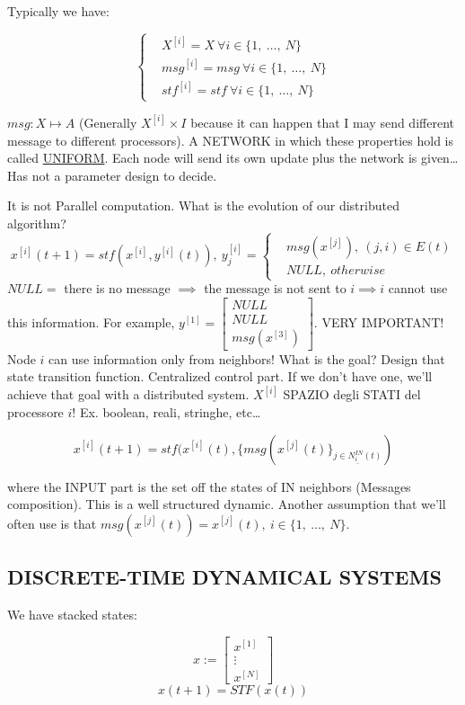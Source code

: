 Typically we have:

\[
	\left\{
	\begin{aligned}
	&X^{[i]} = X\ \forall i \in \{1,\ \dots,\ N\} \\
	&msg^{[i]} = msg\ \forall i \in \{1,\ \dots,\ N\} \\
	&stf^{[i]} = stf\ \forall i \in \{1,\ \dots,\ N\}
	\end{aligned} 
	\right.
\]

$msg:X \mapsto A$ (Generally $X^{[i]}\times I$ because it can happen that I may send different message to different processors).
A NETWORK in which these properties hold is called \underline{UNIFORM}. Each node will send its own update plus the network is given\dots Has not a parameter design to decide.

It is not Parallel computation. What is the evolution of our distributed algorithm?
\[
	x^{[i]}(t+1) = stf(x^{[i]},y^{[i]}(t)),\ y^{[i]}_j = \left\{
	\begin{aligned}
	&msg(x^{[j]}),\ (j,i)\in E(t) \\
	&NULL,\ otherwise
	\end{aligned} 
	\right.
\]
$NULL=$ there is no message $\implies$ the message is not sent to $i \implies i$ cannot use this information.
For example, $y^{[1]} = \begin{bmatrix}NULL\\NULL\\msg(x^{[3]})\end{bmatrix}$. VERY IMPORTANT! Node $i$ can use information only from neighbors!
What is the goal? Design that state transition function. Centralized control part. If we don't have one, we'll achieve that goal with a distributed system. $X^{[i]}$ SPAZIO degli STATI del processore $i$! Ex. boolean, reali, stringhe, etc\dots

\[
	x^{[i]}(t+1) = stf(x^{[i]}(t), \{msg(x^{[j]}(t)\}_{\underline{j\in N_i^{IN}(t)}})
\]

where the INPUT part is the set off the states of IN neighbors (Messages composition). This is a well structured dynamic. Another assumption that we'll often use is that $msg(x^{[j]}(t)) = x^{[j]}(t),\ i\in\{1,\ \dots,\ N\}$.

\subsection{DISCRETE-TIME DYNAMICAL SYSTEMS}

We have stacked states:

\[
	x := \begin{bmatrix}x^{[1]}\\ \vdots\\x^{[N]}\end{bmatrix}
\]
\[
	x(t+1) = STF(x(t))
\]	

